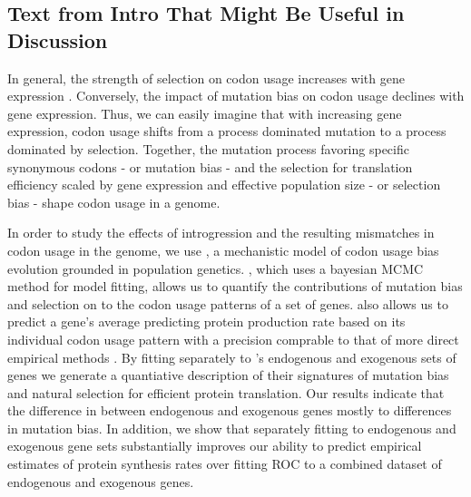 \documentclass[12pt]{article}
\begin{document}
\subsection*{Text from Intro That Might Be Useful in Discussion}
In general, the strength of selection on codon usage increases with gene expression \citep{ikemura1985, gouy1982}.
Conversely, the impact of mutation bias on codon usage declines with gene expression.
Thus, we can easily imagine that with increasing gene expression, codon usage shifts from a process dominated mutation to a process dominated by selection.
Together, the mutation process favoring specific synonymous codons - or mutation bias -  and the selection for translation efficiency scaled by gene expression and effective population size - or selection bias -  shape codon usage in a genome.


In order to study the effects of introgression and the resulting mismatches in codon usage in the \Klu genome,  we use \ROC, a mechanistic model of codon usage bias evolution grounded in population genetics.
\ROC, which uses a bayesian MCMC method for model fitting,  allows us to quantify the contributions of mutation bias and selection on to the codon usage patterns of a set of genes.
\ROC also allows us to predict a gene's average predicting protein production rate based on its individual codon usage pattern with a precision comprable to that of more direct empirical methods \citep{gilchrist2015}.
By fitting \ROC separately to \Klu's endogenous and exogenous sets of genes we generate a quantiative description of their signatures of mutation bias and natural selection for efficient protein translation.
Our results indicate that the difference in \GC between endogenous and exogenous genes mostly to differences in mutation bias.
In addition, we show that separately fitting \ROC to endogenous and exogenous gene sets substantially improves our ability to predict empirical estimates of protein synthesis rates over fitting ROC to a combined dataset of endogenous and exogenous genes.
\end{document}
